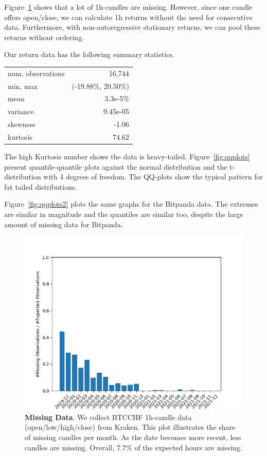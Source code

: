 \documentclass[english,11pt]{article}
\begin{document}
Figure~\ref{fig:missing} shows that a lot of 1h-candles are missing.
However, since one candle offers open/close, we can calculate 1h returns without
the need for consecutive data. Furthermore, with non-autoregressive stationary returns,
we can pool these returns without ordering.

Our return data has the following summary statistics.
\begin{center}
\begin{tabular}{lr}
\hline
num. observations & 16,744\\
min, max &(-19.88\%, 20.50\%) \\
mean & 3.3e-5\% \\
variance & 9.45e-05 \\ 
skewness & -1.06 \\
kurtosis & 74.62 \\
\hline
\end{tabular}
\end{center}

The high Kurtosis number shows the data is heavy-tailed.
Figure~\ref{fig:qqplots} present quantile-quantile plots against the normal distribution
and the t-distribution with 4 degrees of freedom. The QQ-plots show the typical
pattern for fat tailed distributions.

Figure~\ref{fig:qqplots2} plots the same graphs for the Bitpanda data.
The extremes are similar in magnitude and the quantiles are similar too,
despite the large amount of missing data for Bitpanda.

\begin{figure}[h]
    \center
    \includegraphics[width=1\textwidth]{BTCCHFMissingData.png}
    \caption{\textbf{Missing Data}. We collect BTCCHF 1h-candle data
    (open/low/high/close) from Kraken.
    This plot illustrates the share of missing candles per month.
    As the date becomes more recent,
    less candles are missing. Overall, 7.7\% of the expected
    hours are missing.}\label{fig:missing}
\end{figure}
\end{document}
